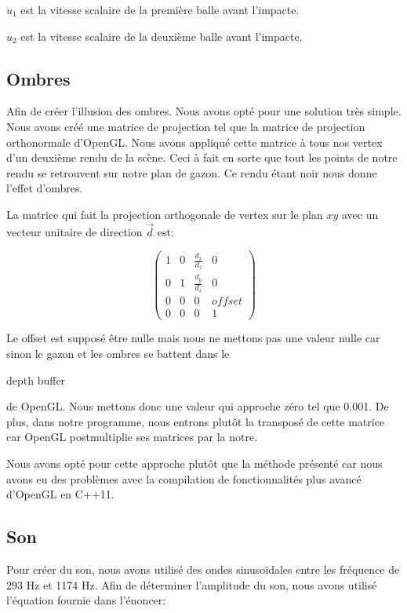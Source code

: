 \documentclass{article}
\begin{document}
$u_1$ est la vitesse scalaire de la première balle avant l'impacte.

$u_2$ est la vitesse scalaire de la deuxième balle avant l'impacte.

\subsection*{Ombres}

Afin de créer l'illusion des ombres. Nous avons opté pour une solution
très simple. Nous avons créé une matrice de projection tel que la
matrice de projection orthonormale d'OpenGL. Nous avons appliqué cette
matrice à tous nos vertex d'un deuxième rendu de la scène. Ceci à fait
en sorte que tout les points de notre rendu se retrouvent sur notre
plan de gazon. Ce rendu étant noir nous donne l'effet d'ombres.

La matrice qui fait la projection orthogonale de vertex sur le plan
$xy$ avec un vecteur unitaire de direction $\vec{d}$ est:

\[ \left(
\begin{array}{cccc}
  1 & 0 & \frac{d_x}{d_z} & 0 \\
  0 & 1 & \frac{d_y}{d_z} & 0 \\
  0 & 0 & 0 & offset \\
  0 & 0 & 0 & 1
\end{array}
\right)\]

Le offset est supposé être nulle mais nous ne mettons pas une valeur
nulle car sinon le gazon et les ombres se battent dans le \begin{it}
  depth buffer \end{it} de OpenGL. Nous mettons donc une valeur qui
approche zéro tel que 0.001. De plus, dans notre programme, nous
entrons plutôt la transposé de cette matrice car OpenGL postmultiplie
ses matrices par la notre.

Nous avons opté pour cette approche plutôt que la méthode présenté car
nous avons eu des problèmes avec la compilation de fonctionnalités plus
avancé d'OpenGL en C++11.

\subsection*{Son}

Pour créer du son, nous avons utilisé des ondes sinusoïdales entre les
fréquence de 293 Hz et 1174 Hz. Afin de déterminer l'amplitude du son,
nous avons utilisé l'équation fournie dans l'énoncer:
\end{document}

